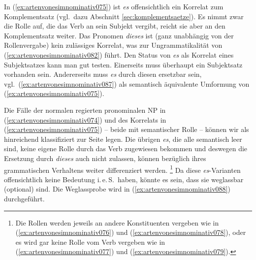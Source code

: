 In (\ref{ex:artenvonesimnominativ075}) ist \textit{es} offensichtlich ein Korrelat zum Komplementsatz (vgl.\ dazu Abschnitt \ref{sec:komplementsaetze}).
Es nimmt zwar die Rolle auf, die das Verb an sein Subjekt vergibt, reicht sie aber an den Komplementsatz weiter.
Das Pronomen \textit{dieses} ist (ganz unabhängig von der Rollenvergabe) kein zulässiges Korrelat, was zur Ungrammatikalität von (\ref{ex:artenvonesimnominativ082}) führt.
Den Status von \textit{es} als Korrelat eines Subjektsatzes kann man gut testen.
Einerseits muss überhaupt ein Subjektsatz vorhanden sein.
Andererseits muss \textit{es} durch diesen ersetzbar sein, vgl.\ (\ref{ex:artenvonesimnominativ087}) als semantisch äquivalente Umformung von (\ref{ex:artenvonesimnominativ075}).


\begin{exe}
\end{exe}


Die Fälle der normalen regierten pronominalen NP in (\ref{ex:artenvonesimnominativ074}) und des Korrelats in (\ref{ex:artenvonesimnominativ075}) -- beide mit semantischer Rolle -- können wir als hinreichend klassifiziert zur Seite legen.
Die übrigen \textit{es}, die alle semantisch leer sind, keine eigene Rolle durch das Verb zugewiesen bekommen und deswegen die Ersetzung durch \textit{dieses} auch nicht zulassen, können bezüglich ihres grammatischen Verhaltens weiter differenziert werden.%
\footnote{Die Rollen werden jeweils an andere Konstituenten vergeben wie in (\ref{ex:artenvonesimnominativ076}) und (\ref{ex:artenvonesimnominativ078}), oder es wird gar keine Rolle vom Verb vergeben wie in (\ref{ex:artenvonesimnominativ077}) und (\ref{ex:artenvonesimnominativ079}).}
Da diese \textit{es}-Varianten offensichtlich keine Bedeutung i.\,e.\,S.\ haben, könnte es \zB sein, dass sie weglassbar (optional) sind.
Die Weglassprobe wird in (\ref{ex:artenvonesimnominativ088}) durchgeführt.


\begin{exe}
  \ex\label{ex:artenvonesimnominativ088}
  \begin{xlist}
  \end{xlist}
\end{exe}


